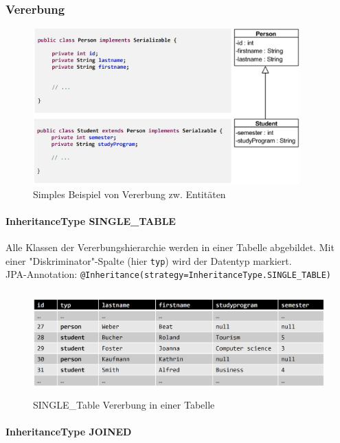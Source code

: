 \documentclass[a4paper]{article}
\begin{document}
			\newpage
			
			\subsubsection{Vererbung}
			
			\begin{figure}[!htb]
				\centering
				\includegraphics[keepaspectratio, height=6cm]{img/persistence/inheritance.png}
				\caption{Simples Beispiel von Vererbung zw. Entitäten}
				\label{fig:inheritance}
			\end{figure}
		
			\paragraph{InheritanceType SINGLE\_TABLE}
			
			Alle Klassen der Vererbungshierarchie werden in einer Tabelle abgebildet.
			Mit einer "Diskriminator"-Spalte (hier \texttt{typ}) wird der Datentyp markiert.\\
			JPA-Annotation: \texttt{@Inheritance(strategy=InheritanceType.SINGLE\_TABLE)}
			
			\begin{figure}[!htb]
				\centering
				\includegraphics[keepaspectratio, height=4cm]{img/persistence/single_table.png}
				\caption{SINGLE\_Table Vererbung in einer Tabelle}
				\label{fig:single_table}
			\end{figure}
		
			\paragraph{InheritanceType JOINED}
			
\end{document}
